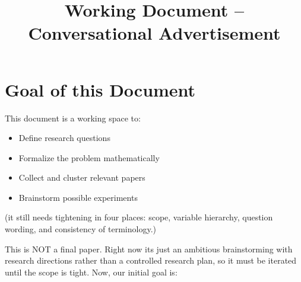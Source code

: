 \documentclass{article}
\title{Working Document -- Conversational Advertisement}
\author{}
\date{}
\begin{document}
\maketitle

\section{Goal of this Document}

This document is a working space to:
\begin{itemize}
    \item Define research questions
    \item Formalize the problem mathematically
    \item Collect and cluster relevant papers
    \item Brainstorm possible experiments
\end{itemize}

(it still needs tightening in four places: scope, variable hierarchy, question wording, and consistency of terminology.)


This is NOT a final paper. Right now its just an ambitious brainstorming with research directions rather than a controlled research plan, so it must be iterated until the scope is tight. Now, our initial goal is:
\\ 
\end{document}
